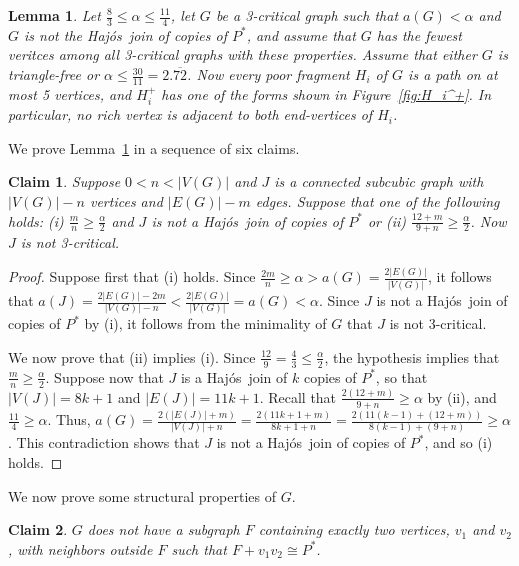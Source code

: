 \documentclass[12pt]{article}
\theoremstyle{plain}
\newtheorem{lem}[prop]{Lemma}
\newtheorem{clm}{Claim}
\theoremstyle{definition}
\theoremstyle{remark}
\def\hajos{Haj\'{o}s}
\begin{document}
\begin{lem} 
\label{lem:summary}
Let $\frac83\le \alpha \le \frac{11}4$, let $G$ be a 3-critical
graph such that $a(G)<\alpha$ and $G$ is not the \hajos\ join of copies of
$P^*$, and assume that $G$ has the fewest veritces among all
3-critical graphs with these properties.  Assume that either $G$ is triangle-free
or $\alpha\le \frac{30}{11}=2.\overline{72}$.  Now every poor fragment $H_i$ of
$G$ is a path on at most 5 vertices, and $H_i^+$ has one of the forms shown in
Figure~\ref{fig:H_i^+}.  In particular, no rich vertex is adjacent to both
end-vertices of $H_i$.
\end{lem}

We prove Lemma~\ref{lem:summary} in a sequence of six claims.

\begin{clm}
Suppose $0<n<|V(G)|$ and $J$ is a connected subcubic graph with $|V(G)|-n$
vertices and $|E(G)|-m$ edges.  Suppose that one of the following holds: (i)
$\frac{m}n\ge \frac{\alpha}2$ and $J$ is not a \hajos\ join of copies of $P^*$
or (ii) $\frac{12+m}{9+n}\ge \frac{\alpha}2$.  Now $J$ is not 3-critical.
\end{clm}

\begin{proof}
Suppose first that (i) holds.  Since $\frac{2m}n\ge
\alpha > a(G)=\frac{2|E(G)|}{|V(G)|}$, it follows that
$a(J)=\frac{2|E(G)|-2m}{|V(G)|-n}<\frac{2|E(G)|}{|V(G)|}=a(G)<\alpha$.  Since
$J$ is not a \hajos\ join of copies of $P^*$ by (i), it follows from the
minimality of $G$ that $J$ is not 3-critical.

We now prove that (ii) implies (i).  Since $\frac{12}9=\frac43\le
\frac{\alpha}2$, the hypothesis implies that $\frac{m}n\ge \frac{\alpha}2$.
Suppose now that $J$ is a \hajos\ join of $k$ copies of $P^*$, so that
$|V(J)|=8k+1$ and $|E(J)|=11k+1$.  Recall that $\frac{2(12+m)}{9+n}\ge \alpha$ by
(ii), and $\frac{11}4\ge \alpha$.  Thus, $a(G)= \frac{2(|E(J)|+m)}{|V(J)|+n} =
\frac{2(11k+1+m)}{8k+1+n} = \frac{2(11(k-1)+(12+m))}{8(k-1)+(9+n)}\ge \alpha$. 
This contradiction shows that $J$ is not a \hajos\ join of copies of $P^*$, and
so (i) holds. 
\end{proof}

We now prove some structural properties of $G$.

\begin{clm}
$G$ does not have a subgraph $F$ containing exactly two vertices, $v_1$ and
$v_2$, with neighbors outside $F$ such that $F+v_1v_2\cong P^*$.
\label{clm:noPete}
\end{clm}
\end{document}
